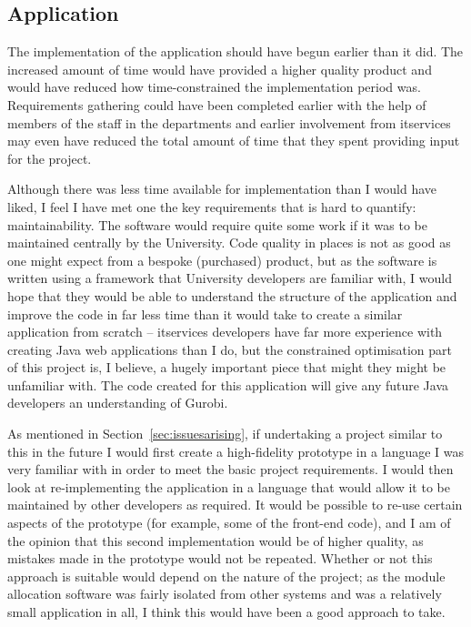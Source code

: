 \subsection{Application}

The implementation of the application should have begun earlier than it did.
The increased amount of time would have provided a higher quality product and
would have reduced how time-constrained the implementation period was.
Requirements gathering could have been completed earlier with the help of
members of the staff in the departments and earlier involvement from
\gls{itservices} may even have reduced the total amount of time that they
spent providing input for the project.

Although there was less time available for implementation than I would have
liked, I feel I have met one the key requirements that is hard to quantify:
maintainability. The software would require quite some work if it was to be
maintained centrally by the University. Code quality in places is not as good
as one might expect from a bespoke (purchased) product, but as the software is
written using a framework that University developers are familiar with, I
would hope that they would be able to understand the structure of the
application and improve the code in far less time than it would take to create
a similar application from scratch -- \gls{itservices} developers have far
more experience with creating Java web applications than I do, but the
constrained optimisation part of this project is, I believe, a hugely
important piece that might they might be unfamiliar with. The code created for
this application will give any future Java developers an understanding of
Gurobi.

As mentioned in Section~\ref{sec:issuesarising}, if undertaking a project
similar to this in the future I would first create a high-fidelity prototype
in a language I was very familiar with in order to meet the basic project
requirements. I would then look at re-implementing the application in a
language that would allow it to be maintained by other developers as required.
It would be possible to re-use certain aspects of the prototype (for example,
some of the front-end code), and I am of the opinion that this second
implementation would be of higher quality, as mistakes made in the prototype
would not be repeated. Whether or not this approach is suitable would depend
on the nature of the project; as the module allocation software was fairly
isolated from other systems and was a relatively small application in all, I
think this would have been a good approach to take.

